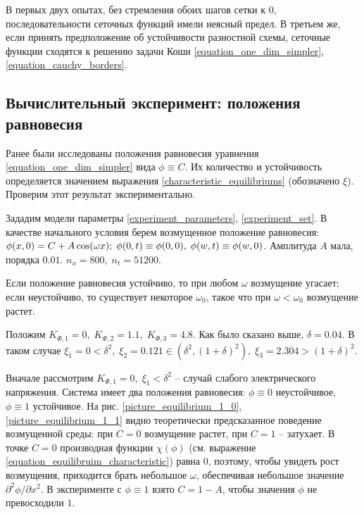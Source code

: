 \documentclass[a4paper,12pt]{article}
\newcommand*{\hm}[1]{#1\nobreak\discretionary{}
{\hbox{$\mathsurround=0pt #1$}}{}}
\theoremstyle{plain}
\theoremstyle{definition}
\begin{document}
В первых двух опытах, без стремления обоих шагов сетки к $0$, последовательности сеточных функций имели неясный предел. В третьем же, если принять предположение об устойчивости разностной схемы, сеточные функции сходятся к решению задачи Коши \eqref{equation_one_dim_simpler}, \eqref{equation_cauchy_borders}.

\pagebreak


\subsection{Вычислительный эксперимент: положения равновесия}

Ранее были исследованы положения равновесия уравнения \eqref{equation_one_dim_simpler} вида $\phi \equiv C$. Их количество и устойчивость определяется значением выражения \eqref{characteristic_equilibriums} (обозначено $\xi$). Проверим этот результат экспериментально.

Зададим модели параметры \eqref{experiment_parameters}, \eqref{experiment_set}. В качестве начального условия берем возмущенное положение равновесия: $\phi(x, 0) = C + A \cos(\omega x); \; \phi(0, t) \equiv \phi(0, 0), \; \phi(w, t) \hm \equiv \phi(w, 0)$. Амплитуда $A$ мала, порядка $0.01$. $n_x = 800, \; n_t = 51200$.

Если положение равновесия устойчиво, то при любом $\omega$ возмущение угасает; если неустойчиво, то существует некоторое $\omega_0$, такое что при $\omega < \omega_0$ возмущение растет.

Положим $K_{\Phi, 1} = 0, \; K_{\Phi, 2} = 1.1, \; K_{\Phi, 3} = 4.8$. Как было сказано выше, $\delta = 0.04$. В таком случае $\xi_1 = 0 < \delta^2, \; \xi_2 = 0.121 \in (\delta^2, (1 + \delta)^2), \; \xi_3 = 2.304 > (1 + \delta)^2$.

Вначале рассмотрим $K_{\Phi, 1} = 0, \; \xi_1 < \delta^2$ -- случай слабого электрического напряжения. Система имеет два положения равновесия: $\phi \equiv 0$ неустойчивое, $\phi \equiv 1$ устойчивое. На рис. \ref{picture_equilibrium_1_0}, \ref{picture_equilibrium_1_1} видно теоретически предсказанное поведение возмущенной среды: при $C = 0$ возмущение растет, при $C = 1$ -- затухает. В точке $C = 0$ производная функции $\chi(\phi)$ (см. выражение \eqref{equation_equilibruim_characteristic}) равна $0$, поэтому, чтобы увидеть рост возмущения, приходится брать небольшое $\omega$, обеспечивая небольшое значение $\partial^2 \phi / \partial x^2$. В эксперименте с $\phi \equiv 1$ взято $C = 1 - A$, чтобы значения $\phi$ не превосходили $1$.
\end{document}
